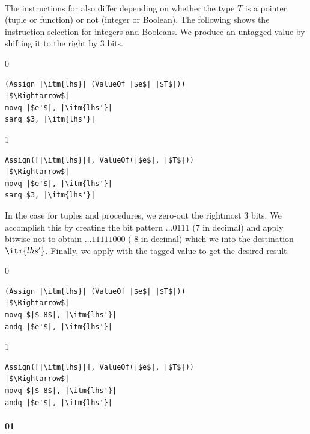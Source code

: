 \documentclass[7x10]{TimesAPriori_MIT}%
\def\racketEd{0}
\def\pythonEd{1}
\def\edition{0}
\newcommand{\racket}[1]{{\if\edition\racketEd{#1}\fi}}
\newcommand{\python}[1]{{\if\edition\pythonEd #1\fi}}
\numberwithin{theorem}{chapter}
\numberwithin{definition}{chapter}
\numberwithin{equation}{chapter}
\begin{document}
\paragraph{}

The instructions for  also differ depending on whether
the type $T$ is a pointer (tuple or function) or not (integer or
Boolean). The following shows the instruction selection for integers
and Booleans.  We produce an untagged value by shifting it to the
right by 3 bits.
%
{\if\edition\racketEd
\begin{lstlisting}
(Assign |\itm{lhs}| (ValueOf |$e$| |$T$|))
|$\Rightarrow$|
movq |$e'$|, |\itm{lhs'}|
sarq $3, |\itm{lhs'}|
\end{lstlisting}
\fi}
%
{\if\edition\pythonEd
\begin{lstlisting}
Assign([|\itm{lhs}|], ValueOf(|$e$|, |$T$|))
|$\Rightarrow$|
movq |$e'$|, |\itm{lhs'}|
sarq $3, |\itm{lhs'}|
\end{lstlisting}
\fi}
%
In the case for tuples and procedures, we zero-out the rightmost 3
bits. We accomplish this by creating the bit pattern $\ldots 0111$
($7$ in decimal) and apply bitwise-not to obtain $\ldots 11111000$ (-8
in decimal) which we  into the destination $\itm{lhs'}$.
Finally, we apply  with the tagged value to get the desired
result.
%
{\if\edition\racketEd
\begin{lstlisting}
(Assign |\itm{lhs}| (ValueOf |$e$| |$T$|))
|$\Rightarrow$|
movq $|$-8$|, |\itm{lhs'}|
andq |$e'$|, |\itm{lhs'}|
\end{lstlisting}
\fi}
%
{\if\edition\pythonEd
\begin{lstlisting}
Assign([|\itm{lhs}|], ValueOf(|$e$|, |$T$|))
|$\Rightarrow$|
movq $|$-8$|, |\itm{lhs'}|
andq |$e'$|, |\itm{lhs'}|
\end{lstlisting}
\fi}



\paragraph{\racket{}\python{}}
\end{document}
